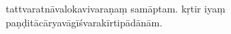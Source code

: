 \documentclass[12pt]{article}
\begin{document}
tattvaratnāvalokavivaraṇaṃ samāptam. kṛtir iyaṃ paṇḍitācāryavāgīśvarakīrtipādānām.\\

% 
 
\end{document}
